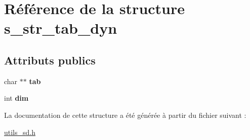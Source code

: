 \hypertarget{structs__str__tab__dyn}{}\section{Référence de la structure s\+\_\+str\+\_\+tab\+\_\+dyn}
\label{structs__str__tab__dyn}
\subsection*{Attributs publics}
\begin{DoxyCompactItemize}
\item 
\mbox{\label{structs__str__tab__dyn_a4b50ff3e6f701ceb1d676b88a626c126}} 
char $\ast$$\ast$ {\bfseries tab}
\item 
\mbox{\label{structs__str__tab__dyn_a904865ad24b8196acf391394cf78cb1d}} 
int {\bfseries dim}
\end{DoxyCompactItemize}


La documentation de cette structure a été générée à partir du fichier suivant \+:\begin{DoxyCompactItemize}
\item 
\hyperlink{utils__sd_8h}{utils\+\_\+sd.\+h}\end{DoxyCompactItemize}
